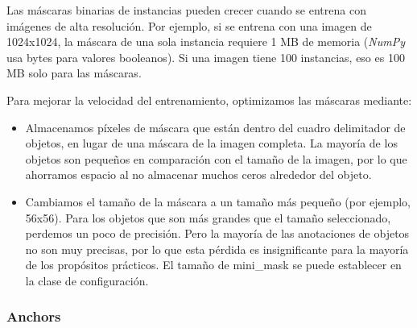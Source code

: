 Las máscaras binarias de instancias pueden crecer cuando se entrena con imágenes de alta resolución. Por ejemplo, si se entrena con una imagen de 1024x1024, la máscara de una sola instancia requiere 1 MB de memoria (\textit{NumPy} usa bytes para valores booleanos). Si una imagen tiene 100 instancias, eso es 100 MB solo para las máscaras.

Para mejorar la velocidad del entrenamiento, optimizamos las máscaras mediante:

\begin{itemize}
    \item Almacenamos píxeles de máscara que están dentro del cuadro delimitador de objetos, en lugar de una máscara de la imagen completa. La mayoría de los objetos son pequeños en comparación con el tamaño de la imagen, por lo que ahorramos espacio al no almacenar muchos ceros alrededor del objeto.
    \item Cambiamos el tamaño de la máscara a un tamaño más pequeño (por ejemplo, 56x56). Para los objetos que son más grandes que el tamaño seleccionado, perdemos un poco de precisión. Pero la mayoría de las anotaciones de objetos no son muy precisas, por lo que esta pérdida es insignificante para la mayoría de los propósitos prácticos. El tamaño de mini\_mask se puede establecer en la clase de configuración.
\end{itemize}







\newpage

\subsubsection{Anchors}

